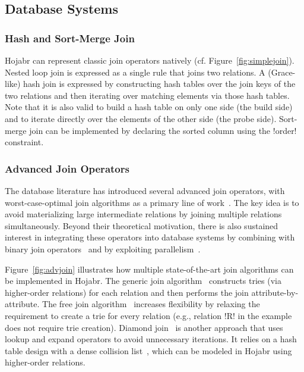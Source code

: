 \documentclass[sigconf,nonacm]{acmart}
\begin{document}
\subsection{Database Systems}

\subsubsection{Hash and Sort-Merge Join} 
Hojabr can represent classic join operators natively (cf. Figure~\ref{fig:simplejoin}). Nested loop join is expressed as a single rule that joins two relations. A (Grace-like) hash join is expressed by constructing hash tables over the join keys of the two relations and then iterating over matching elements via those hash tables. Note that it is also valid to build a hash table on only one side (the build side) and to iterate directly over the elements of the other side (the probe side). Sort-merge join can be implemented by declaring the sorted column using the !order! constraint.



\subsubsection{Advanced Join Operators} 
The database literature has introduced several advanced join operators, with worst-case-optimal join algorithms as a primary line of work~\cite{wcojalg1,wcojalg2,graphflow,emptyheaded,leapfrog,ngo2014skew}. The key idea is to avoid materializing large intermediate relations by joining multiple relations simultaneously. Beyond their theoretical motivation, there is also sustained interest in integrating these operators into database systems by combining with binary join operators~\cite{graphflow,kaboli2025unified,wang2023free} and by exploiting parallelism~\cite{freitag2020adopting,wu2025honeycomb}.

Figure~\ref{fig:advjoin} illustrates how multiple state-of-the-art join algorithms can be implemented in Hojabr. The generic join algorithm~\cite{ngo2014skew} constructs tries (via higher-order relations) for each relation and then performs the join attribute-by-attribute. The free join algorithm~\cite{wang2023free} increases flexibility by relaxing the requirement to create a trie for every relation (e.g., relation !R! in the example does not require trie creation). Diamond join~\cite{birler2024robust} is another approach that uses lookup and expand operators to avoid unnecessary iterations. It relies on a hash table design with a dense collision list~\cite{birler2024simple}, which can be modeled in Hojabr using higher-order relations.
\end{document}
